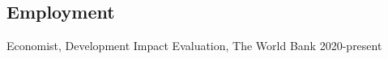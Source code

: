 \documentclass[letterpaper, margin, 10pt]{res} %
\begin{document}
\begin{resume}




 




%


\section{\sc \textbf{Employment}}
Economist, Development Impact Evaluation, The World Bank \hfill{2020-present}


\end{resume}
\end{document}
